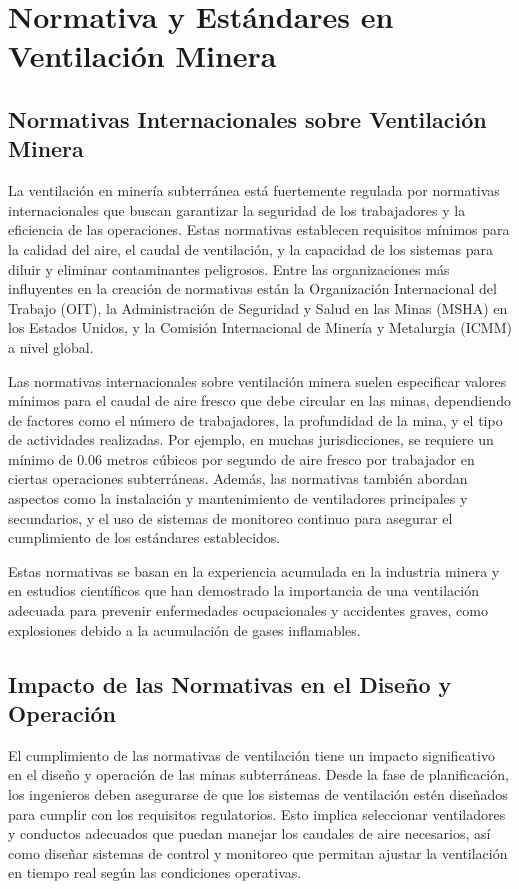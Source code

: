 \section{Normativa y Estándares en Ventilación Minera}

\subsection{Normativas Internacionales sobre Ventilación Minera}

La ventilación en minería subterránea está fuertemente regulada por normativas internacionales que buscan garantizar la seguridad de los trabajadores y la eficiencia de las operaciones. Estas normativas establecen requisitos mínimos para la calidad del aire, el caudal de ventilación, y la capacidad de los sistemas para diluir y eliminar contaminantes peligrosos. Entre las organizaciones más influyentes en la creación de normativas están la Organización Internacional del Trabajo (OIT), la Administración de Seguridad y Salud en las Minas (MSHA) en los Estados Unidos, y la Comisión Internacional de Minería y Metalurgia (ICMM) a nivel global.

Las normativas internacionales sobre ventilación minera suelen especificar valores mínimos para el caudal de aire fresco que debe circular en las minas, dependiendo de factores como el número de trabajadores, la profundidad de la mina, y el tipo de actividades realizadas. Por ejemplo, en muchas jurisdicciones, se requiere un mínimo de 0.06 metros cúbicos por segundo de aire fresco por trabajador en ciertas operaciones subterráneas. Además, las normativas también abordan aspectos como la instalación y mantenimiento de ventiladores principales y secundarios, y el uso de sistemas de monitoreo continuo para asegurar el cumplimiento de los estándares establecidos.

Estas normativas se basan en la experiencia acumulada en la industria minera y en estudios científicos que han demostrado la importancia de una ventilación adecuada para prevenir enfermedades ocupacionales y accidentes graves, como explosiones debido a la acumulación de gases inflamables.

\subsection{Impacto de las Normativas en el Diseño y Operación}

El cumplimiento de las normativas de ventilación tiene un impacto significativo en el diseño y operación de las minas subterráneas. Desde la fase de planificación, los ingenieros deben asegurarse de que los sistemas de ventilación estén diseñados para cumplir con los requisitos regulatorios. Esto implica seleccionar ventiladores y conductos adecuados que puedan manejar los caudales de aire necesarios, así como diseñar sistemas de control y monitoreo que permitan ajustar la ventilación en tiempo real según las condiciones operativas.

